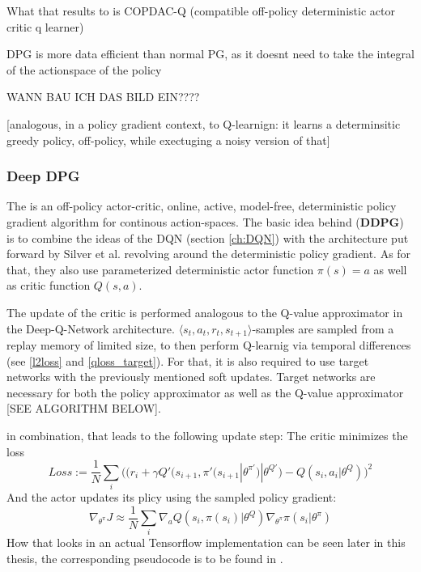 What that results to is COPDAC-Q (compatible off-policy deterministic actor critic q learner)

DPG is more data efficient than normal PG, as it doesnt need to take the integral of the actionspace of the policy

WANN BAU ICH DAS BILD EIN????

[analogous, in a policy gradient context, to Q-learnign: it learns a determinsitic greedy policy, off-policy, while exectuging a noisy version of that]

\subsubsection*{Deep DPG}

The  is an off-policy actor-critic, online, active, model-free, deterministic policy gradient algorithm for continous action-spaces. The basic idea behind  (\textbf{DDPG}) is to combine the ideas of the DQN (section \ref{ch:DQN}) with the architecture put forward by Silver et al. \cite{silver_deterministic_2014} revolving around the deterministic policy gradient. As for that, they also use parameterized deterministic actor function $\pi(s) = a$ as well as critic function $Q(s,a)$.

The update of the critic is performed analogous to the Q-value approximator in the Deep-Q-Network architecture. $\langle s_t, a_t, r_t, s_{t+1} \rangle$-samples are sampled from a replay memory of limited size, to then perform Q-learnig via temporal differences (see \ref{l2loss} and \ref{qloss_target}). For that, it is also required to use target networks with the previously mentioned soft updates. Target networks are necessary for both the policy approximator as well as the Q-value approximator [SEE ALGORITHM BELOW].

in combination, that leads to the following update step:
The critic minimizes the loss
\begin{equation}
	Loss := \frac{1}{N} \sum_i \Big( \big( r_i + \gamma Q'(s_{i+1},\pi'(s_{i+1}|\theta^{\pi'})|\theta^{Q'} \big) - Q(s_i,a_i|\theta^Q)\Big)^2
\end{equation}
And the actor updates its plicy using the sampled policy gradient:
\begin{equation}
	\nabla_{\theta^\pi}J \approx \frac{1}{N} \sum_i \nabla_a Q(s_i,\pi(s_i)|\theta^Q) \nabla_{\theta^\pi} \pi(s_i|\theta^\pi)
\end{equation}
How that looks in an actual Tensorflow implementation can be seen later in this thesis, the corresponding pseudocode is to be found in \cite{lillicrap_continuous_2015}.

